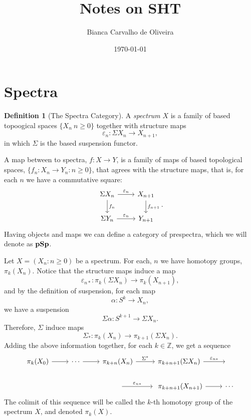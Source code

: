 \documentclass[a4paper,english,11pt]{article}
\title{Notes on SHT}
\author{Bianca Carvalho de Oliveira}
\date{\today}
\theoremstyle{definition}
\newtheorem{Def}{Definition}
\theoremstyle{plain}
\theoremstyle{remark}
\newcommand{\pSp}{\textbf{\text{pSp}}}
\newcommand{\struc}{\varepsilon}
\begin{document}
\maketitle
\section{Spectra}
\begin{Def}[The Spectra Category]
    A \textit{spectrum} \(X\) is a family of based topoogical spaces \(\{X_n\:n\geq 0\}\) together with structure maps
    \[\struc_n:\Sigma X_n\to X_{n+1},\]
    in which \(\Sigma \) is the based suspension functor.

    A map between to spectra, \(f:X\to Y\), is a family of maps of based topological spaces, \(\{f_n:X_n\to Y_n:n\geq 0\}\), that agrees with the structure maps, that is, for each \(n\) we have a commutative square:
    \begin{equation*}
      \begin{tikzcd}
        \Sigma X_n \arrow{r}{\struc_n}\arrow{d}{f_n}& X_{n+1}\arrow{d}{f_{n+1}}\\
        \Sigma Y_n \arrow{r}{\struc_n}& Y_{n+1}
      \end{tikzcd}.
    \end{equation*}
    Having objects and maps we can define a category of prespectra, which we will denote as \(\pSp\). 
\end{Def}
Let \(X=(X_n:n\geq 0)\) be a spectrum. For each, \(n\) we have homotopy groups, \(\pi_k(X_n)\). Notice that the structure maps induce a map
\[\struc_{n\ast}:\pi_k(\Sigma X_n)\to\pi_k(X_{n+1}),\]
and by the definition of suspension, for each map
\[\alpha:S^k\to X_n,\]
we have a suspension
\[\Sigma\alpha:S^{k+1}\to \Sigma X_n.\]
Therefore, \(\Sigma\) induce maps
\[\Sigma_\ast:\pi_k(X_n)\to\pi_{k+1}(\Sigma X_n).\]
Adding the above information together, for each \(k\in\mathbb{Z}\), we get a sequence
\begin{equation*}
    \begin{tikzcd}
        \pi_k(X_0)\arrow{r}&\cdots\arrow{r}&\pi_{k+n}(X_n)\arrow{r}{\Sigma^\ast}&\pi_{k+n+1}(\Sigma X_n)\arrow{r}{\struc_{n\ast}}&\  \\
        \ &\ &\ \arrow{r}{\struc_{n\ast}}&\ \pi_{k+n+1}(X_{n+1})\arrow{r}&\cdots
    \end{tikzcd}
\end{equation*}
The colimit of this sequence will be called the \(k\)-th homotopy group of the spectrum \(X\), and denoted \(\pi_k(X)\).\\
\end{document}
